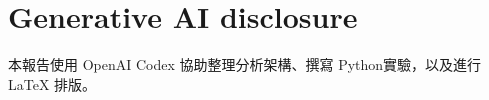 \documentclass[11pt]{article}
\begin{document}





\section*{Generative AI disclosure}
本報告使用 OpenAI Codex 協助整理分析架構、撰寫 Python實驗，以及進行 LaTeX 排版。
\end{document}

